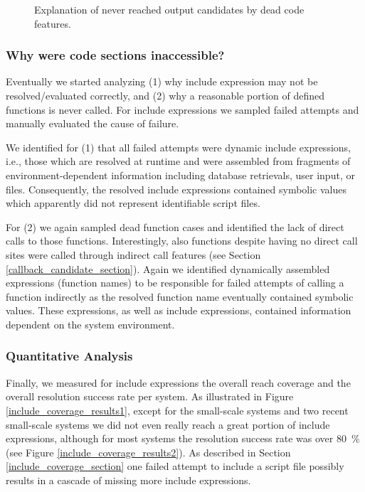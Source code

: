 \documentclass[preprint]{sig-alternate-05-2015}
\begin{document}
\begin{figure}
	
	\caption{Explanation of never reached output candidates by dead code features.}
	\label{dead_explanations}
\end{figure}

\subsubsection{Why were code sections inaccessible?}  
Eventually we started analyzing (1) why include expression may not be resolved/evaluated correctly, and (2) why a reasonable portion of defined functions is never called. For include expressions we  sampled failed attempts and manually evaluated the cause of failure. 

We identified for (1) that all failed attempts were dynamic include expressions, i.e., those which are resolved at runtime and were assembled from fragments of environment-dependent information including database retrievals, user input, or files. Consequently, the resolved include expressions contained symbolic values which apparently did not represent identifiable script files.

For (2) we again sampled dead function cases and identified the lack of direct calls to those functions. Interestingly, also functions despite having no direct call sites were called through indirect call features (see Section \ref{callback_candidate_section}). Again we identified dynamically assembled expressions (function names) to be responsible for failed attempts of calling a function indirectly as the resolved function name eventually contained symbolic values. These expressions, as well as include expressions, contained information dependent on the system environment.

\subsubsection{Quantitative Analysis}
Finally, we measured for include expressions the overall reach coverage and the overall resolution success rate per system. As illustrated in Figure \ref{include_coverage_results1}, except for the small-scale systems and two recent small-scale systems we did not even really reach a great portion of include expressions, although for most systems the resolution success rate was over 80~\% (see Figure \ref{include_coverage_results2}). As described in Section \ref{include_coverage_section} one failed attempt to include a script file possibly results in a cascade of missing more include expressions.
\end{document}
